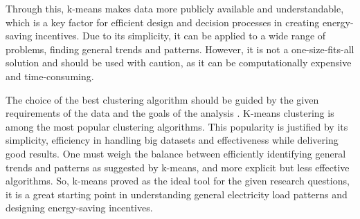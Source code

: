 Through this, k-means makes data more publicly available and understandable, which is a key factor for efficient design and decision processes in creating energy-saving incentives.
Due to its simplicity, it can be applied to a wide range of problems, finding general trends and patterns.
However, it is not a one-size-fits-all solution and should be used with caution, as it can be computationally expensive and time-consuming.

The choice of the best clustering algorithm should be guided by the given requirements of the data and the goals of the analysis \cite{COL-ALT}.
K-means clustering is among the most popular clustering algorithms.
This popularity is justified by its simplicity, efficiency in handling big datasets and effectiveness while delivering good results.
One must weigh the balance between efficiently identifying general trends and patterns as suggested by k-means, and more explicit but less effective algorithms.
So, k-means proved as the ideal tool for the given research questions, it is a great starting point in understanding general electricity load patterns and designing energy-saving incentives.
